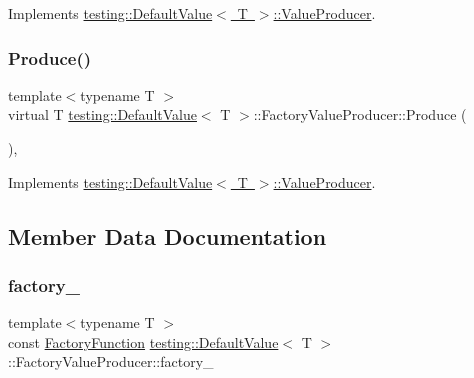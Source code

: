 Implements \mbox{\hyperlink{classtesting_1_1_default_value_1_1_value_producer_adb9e38abe068ac2e792b53fd32bd7e96}{testing\+::\+Default\+Value$<$ T $>$\+::\+Value\+Producer}}.

\mbox{\label{classtesting_1_1_default_value_1_1_factory_value_producer_a246a02412c099b293d905a9749c0fab3}} 
\subsubsection{\texorpdfstring{Produce()}{Produce()}\hspace{0.1cm}{\footnotesize\ttfamily [3/3]}}
{\footnotesize\ttfamily template$<$typename T $>$ \\
virtual T \mbox{\hyperlink{classtesting_1_1_default_value}{testing\+::\+Default\+Value}}$<$ T $>$\+::Factory\+Value\+Producer\+::\+Produce (\begin{DoxyParamCaption}{ }\end{DoxyParamCaption})\hspace{0.3cm}{\ttfamily [inline]}, {\ttfamily [virtual]}}



Implements \mbox{\hyperlink{classtesting_1_1_default_value_1_1_value_producer_adb9e38abe068ac2e792b53fd32bd7e96}{testing\+::\+Default\+Value$<$ T $>$\+::\+Value\+Producer}}.



\subsection{Member Data Documentation}
\mbox{\label{classtesting_1_1_default_value_1_1_factory_value_producer_ab3a016297d3a8fd3c2849c5a4d202d9b}} 
\subsubsection{\texorpdfstring{factory\_}{factory\_}}
{\footnotesize\ttfamily template$<$typename T $>$ \\
const \mbox{\hyperlink{classtesting_1_1_default_value_a5763a68d75e0a4c97fcaff708e2df803}{Factory\+Function}} \mbox{\hyperlink{classtesting_1_1_default_value}{testing\+::\+Default\+Value}}$<$ T $>$\+::Factory\+Value\+Producer\+::factory\+\_\+\hspace{0.3cm}{\ttfamily [private]}}



